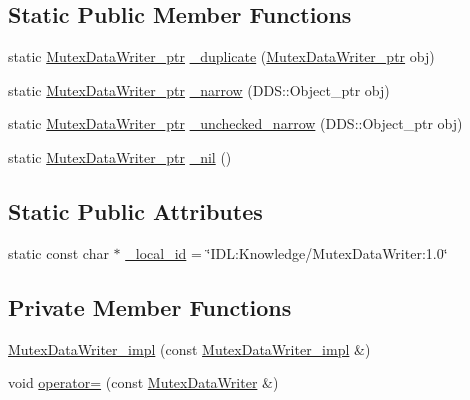 \subsection*{Static Public Member Functions}
\begin{DoxyCompactItemize}
\item 
static \hyperlink{classKnowledge_1_1MutexDataWriter}{MutexDataWriter\_\-ptr} \hyperlink{classKnowledge_1_1MutexDataWriter_ae3593f0350ec7e2c3d58a9a40eb6169f}{\_\-duplicate} (\hyperlink{classKnowledge_1_1MutexDataWriter}{MutexDataWriter\_\-ptr} obj)
\item 
static \hyperlink{classKnowledge_1_1MutexDataWriter}{MutexDataWriter\_\-ptr} \hyperlink{classKnowledge_1_1MutexDataWriter_add05fa3f246338a80646cb11baf7725d}{\_\-narrow} (DDS::Object\_\-ptr obj)
\item 
static \hyperlink{classKnowledge_1_1MutexDataWriter}{MutexDataWriter\_\-ptr} \hyperlink{classKnowledge_1_1MutexDataWriter_a012037ba81aa1415cb853fdfb4cb58f4}{\_\-unchecked\_\-narrow} (DDS::Object\_\-ptr obj)
\item 
static \hyperlink{classKnowledge_1_1MutexDataWriter}{MutexDataWriter\_\-ptr} \hyperlink{classKnowledge_1_1MutexDataWriter_a5b045618b232b087bd9288be1c0d1e17}{\_\-nil} ()
\end{DoxyCompactItemize}
\subsection*{Static Public Attributes}
\begin{DoxyCompactItemize}
\item 
static const char $\ast$ \hyperlink{classKnowledge_1_1MutexDataWriter_acfa4fbf8d9565507badea82e4542f611}{\_\-local\_\-id} = \char`\"{}IDL:Knowledge/MutexDataWriter:1.0\char`\"{}
\end{DoxyCompactItemize}
\subsection*{Private Member Functions}
\begin{DoxyCompactItemize}
\item 
\hyperlink{classKnowledge_1_1MutexDataWriter__impl_ab8ac04298f07614073f7fe2e5f08c3a2}{MutexDataWriter\_\-impl} (const \hyperlink{classKnowledge_1_1MutexDataWriter__impl}{MutexDataWriter\_\-impl} \&)
\item 
void \hyperlink{classKnowledge_1_1MutexDataWriter__impl_ab05f389bb1237c74a39c99e5c9d6d284}{operator=} (const \hyperlink{classKnowledge_1_1MutexDataWriter}{MutexDataWriter} \&)
\end{DoxyCompactItemize}


